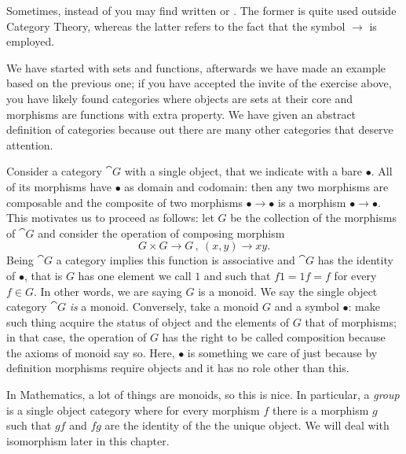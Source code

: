 Sometimes, instead of  you may find written  or
. The former is quite used outside Category Theory, whereas
the latter refers to the fact that the symbol \(\to\) is employed.

We have started with sets and functions, afterwards we have made an
example based on the previous one; if you have accepted the invite of
the exercise above, you have likely found categories where objects are
sets at their core and morphisms are functions with extra property. We
have given an abstract definition of categories because out there are
many other categories that deserve attention.

\begin{example}
  Consider a category \(\cat G\) with a single object, that we
  indicate with a bare \(\bullet\). All of its morphisms have
  \(\bullet\) as domain and codomain: then any two morphisms are
  composable and the composite of two morphisms
  \(\bullet \to \bullet\) is a morphism \(\bullet \to \bullet\). This
  motivates us to proceed as follows: let \(G\) be the collection of
  the morphisms of \(\cat G\) and consider the operation of composing
  morphism
  \[G \times G \to G\,,\ (x, y) \to xy .\] Being \(\cat G\) a category
  implies this function is associative and \(\cat G\) has the identity
  of \(\bullet\), that is \(G\) has one element we call \(1\) and such
  that \(f1 = 1f = f\) for every \(f \in G\). In other words, we are
  saying \(G\) is a monoid. We say the single object category
  \(\cat G\) {\em is} a monoid. \newline Conversely, take a monoid
  \(G\) and a symbol \(\bullet\): make such thing acquire the status
  of object and the elements of \(G\) that of morphisms; in that case,
  the operation of \(G\) has the right to be called composition
  because the axioms of monoid say so. Here, \(\bullet\) is something
  we care of just because by definition morphisms require objects and
  it has no role other than this.
\end{example}

In Mathematics, a lot of things are monoids, so this is nice. In
particular, a {\em group} is a single object category where for every
morphism \(f\) there is a morphism \(g\) such that \(gf\) and \(fg\)
are the identity of the the unique object. We will deal with
isomorphism later in this chapter.

